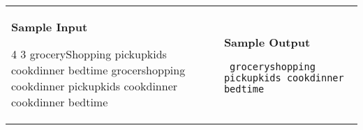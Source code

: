 \documentclass[11pt]{article}
\begin{document}
\vspace{0.25in}\hspace{-0.3in}\begin{tabular}{ll}

\parbox{3in}{{\large\bf Sample Input}

\vspace{0.15in}

{\tt 

4 3\linebreak
groceryShopping\linebreak
pickupkids\linebreak
cookdinner\linebreak
bedtime\linebreak
grocershopping cookdinner\linebreak
pickupkids cookdinner\linebreak
cookdinner bedtime
}
}

&

\parbox{3in}{{\large\bf Sample Output}

\vspace{0.15in}

{\tt
groceryshopping pickupkids cookdinner bedtime
}
}

\\
\end{tabular}
\end{document}
